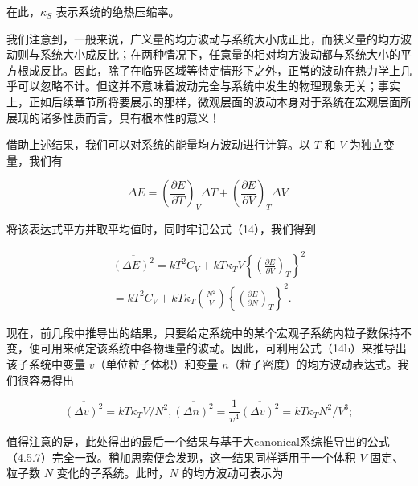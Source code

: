在此，\(\kappa_{S}\) 表示系统的绝热压缩率。

我们注意到，一般来说，广义量的均方波动与系统大小成正比，而狭义量的均方波动则与系统大小成反比；在两种情况下，任意量的相对均方波动都与系统大小的平方根成反比。因此，除了在临界区域等特定情形下之外，正常的波动在热力学上几乎可以忽略不计。但这并不意味着波动完全与系统中发生的物理现象无关；事实上，正如后续章节所将要展示的那样，微观层面的波动本身对于系统在宏观层面所展现的诸多性质而言，具有根本性的意义！

借助上述结果，我们可以对系统的能量均方波动进行计算。以 \(T\) 和 \(V\) 为独立变量，我们有

\begin{equation}\tag{15.1.19}\label{eq:15.1.19}
\Delta E = \left( { \frac { \partial E } { \partial T } } \right) _ { V } \Delta T + \left( { \frac { \partial E } { \partial V } } \right) _ { T } \Delta V .
\end{equation}

将该表达式平方并取平均值时，同时牢记公式（14），我们得到

\begin{equation}\tag{15.1.20}\label{eq:15.1.20}
\begin{array}{r} { \overline { { ( \Delta E ) ^{2} } } = k T ^{2} C _ { V } + k T \kappa _ { T } V \left\{ \left( \frac { \partial E } { \partial V } \right) _ { T } \right\} ^{2} } \\{ = k T ^{2} C _ { V } + k T \kappa _ { T } \left( \frac { N ^{2} } { V } \right) \left\{ \left( \frac { \partial E } { \partial N } \right) _ { T } \right\} ^{2} . } \end{array}
\end{equation}

现在，前几段中推导出的结果，只要给定系统中的某个宏观子系统内粒子数保持不变，便可用来确定该系统中各物理量的波动。因此，可利用公式（14b）来推导出该子系统中变量 \(v\)（单位粒子体积）和变量 \(n\)（粒子密度）的均方波动表达式。我们很容易得出

\begin{equation}\tag{15.1.21}\label{eq:15.1.21}
\overline { { ( \Delta v ) ^{2} } } = k T \kappa _ { T } V / N ^{2} ,  \overline { { ( \Delta n ) ^{2} } } = \frac { 1 } { v ^{4} } \overline { { ( \Delta v ) ^{2} } } = k T \kappa _ { T } N ^{2} / V ^{3} ;
\end{equation}

值得注意的是，此处得出的最后一个结果与基于大canonical系综推导出的公式（4.5.7）完全一致。稍加思索便会发现，这一结果同样适用于一个体积 \(V\) 固定、粒子数 \(N\) 变化的子系统。此时，\(N\) 的均方波动可表示为

